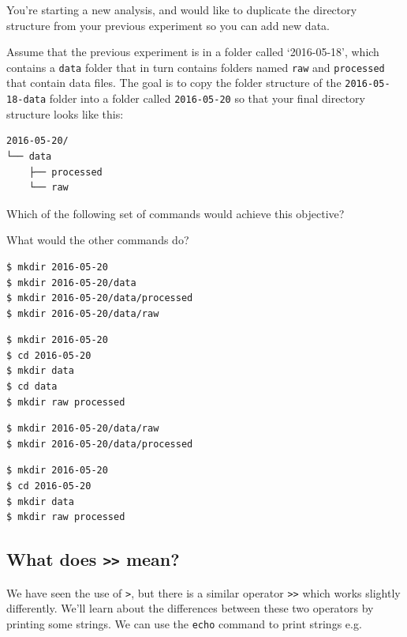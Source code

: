 \documentclass[
]{krantz}
\begin{document}
You're starting a new analysis, and would like to duplicate the directory
structure from your previous experiment so you can add new data.

Assume that the previous experiment is in a folder called `2016-05-18',
which contains a \texttt{data} folder that in turn contains folders named \texttt{raw} and
\texttt{processed} that contain data files. The goal is to copy the folder structure
of the \texttt{2016-05-18-data} folder into a folder called \texttt{2016-05-20}
so that your final directory structure looks like this:

\begin{verbatim}
2016-05-20/
└── data
    ├── processed
    └── raw
\end{verbatim}

Which of the following set of commands would achieve this objective?

What would the other commands do?

\begin{verbatim}
$ mkdir 2016-05-20
$ mkdir 2016-05-20/data
$ mkdir 2016-05-20/data/processed
$ mkdir 2016-05-20/data/raw
\end{verbatim}

\begin{verbatim}
$ mkdir 2016-05-20
$ cd 2016-05-20
$ mkdir data
$ cd data
$ mkdir raw processed
\end{verbatim}

\begin{verbatim}
$ mkdir 2016-05-20/data/raw
$ mkdir 2016-05-20/data/processed
\end{verbatim}

\begin{verbatim}
$ mkdir 2016-05-20
$ cd 2016-05-20
$ mkdir data
$ mkdir raw processed
\end{verbatim}

\hypertarget{bash-basics-ex-redirect-append}{%
\subsection{\texorpdfstring{What does \texttt{\textgreater{}\textgreater{}} mean?}{What does \textgreater\textgreater{} mean?}}\label{bash-basics-ex-redirect-append}}

We have seen the use of \texttt{\textgreater{}}, but there is a similar operator \texttt{\textgreater{}\textgreater{}} which works slightly differently.
We'll learn about the differences between these two operators by printing some strings.
We can use the \texttt{echo} command to print strings e.g.
\end{document}
